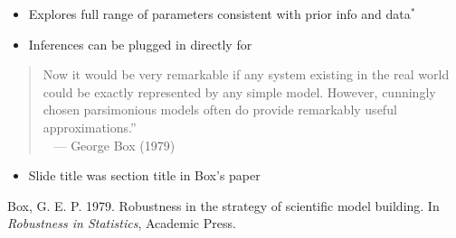 \documentclass[10pt]{report}
\begin{document}
%
\begin{itemize}
\item Explores full range of parameters consistent with prior info and
  data$^*$
\item Inferences can be plugged in directly for
\end{itemize}


%
\begin{quote}
  \hspace*{-5pt}{\Large``}Now it would be very remarkable if any system existing in the real
  world could be exactly represented by any simple model. However,
  cunningly chosen parsimonious models often do provide remarkably
  useful approximations.{\Large''}
\\
\mbox{ } \hfill {\small --- George Box (1979)}

\end{quote}
\begin{itemize}
\item Slide title was section title in Box's paper
\end{itemize}
\vfill
\hfill {\tiny Box, G. E. P. 1979. Robustness in the strategy of
  scientific model building.  In
  {\slshape Robustness in Statistics}, Academic Press.}
\end{document}
